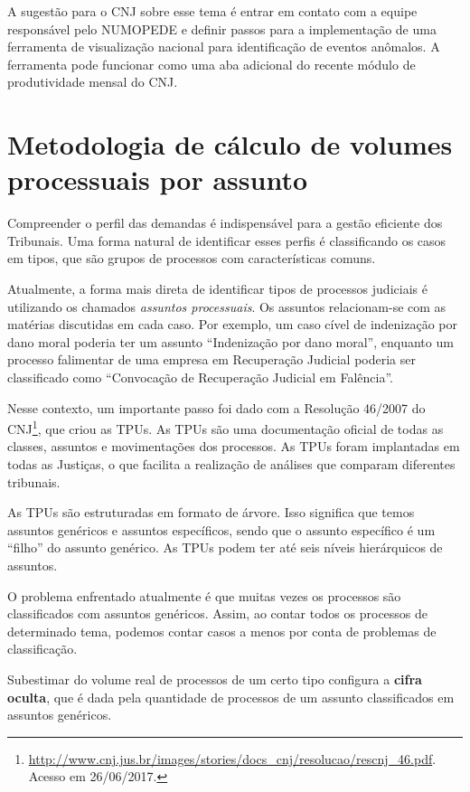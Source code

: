 \documentclass[]{report}
\begin{document}
A sugestão para o CNJ sobre esse tema é entrar em contato com a equipe
responsável pelo NUMOPEDE e definir passos para a implementação de uma
ferramenta de visualização nacional para identificação de eventos
anômalos. A ferramenta pode funcionar como uma aba adicional do recente
módulo de produtividade mensal do CNJ.

\section{Metodologia de cálculo de volumes processuais por
assunto}\label{metodologia-de-calculo-de-volumes-processuais-por-assunto}

Compreender o perfil das demandas é indispensável para a gestão
eficiente dos Tribunais. Uma forma natural de identificar esses perfis é
classificando os casos em tipos, que são grupos de processos com
características comuns.

Atualmente, a forma mais direta de identificar tipos de processos
judiciais é utilizando os chamados \emph{assuntos processuais}. Os
assuntos relacionam-se com as matérias discutidas em cada caso. Por
exemplo, um caso cível de indenização por dano moral poderia ter um
assunto ``Indenização por dano moral'', enquanto um processo falimentar
de uma empresa em Recuperação Judicial poderia ser classificado como
``Convocação de Recuperação Judicial em Falência''.

Nesse contexto, um importante passo foi dado com a Resolução 46/2007 do
CNJ\footnote{\url{http://www.cnj.jus.br/images/stories/docs_cnj/resolucao/rescnj_46.pdf}.
  Acesso em 26/06/2017.}, que criou as TPUs. As TPUs são uma
documentação oficial de todas as classes, assuntos e movimentações dos
processos. As TPUs foram implantadas em todas as Justiças, o que
facilita a realização de análises que comparam diferentes tribunais.

As TPUs são estruturadas em formato de árvore. Isso significa que temos
assuntos genéricos e assuntos específicos, sendo que o assunto
específico é um ``filho'' do assunto genérico. As TPUs podem ter até
seis níveis hierárquicos de assuntos.

O problema enfrentado atualmente é que muitas vezes os processos são
classificados com assuntos genéricos. Assim, ao contar todos os
processos de determinado tema, podemos contar casos a menos por conta de
problemas de classificação.

Subestimar do volume real de processos de um certo tipo configura a
\textbf{cifra oculta}, que é dada pela quantidade de processos de um
assunto classificados em assuntos genéricos.
\end{document}

